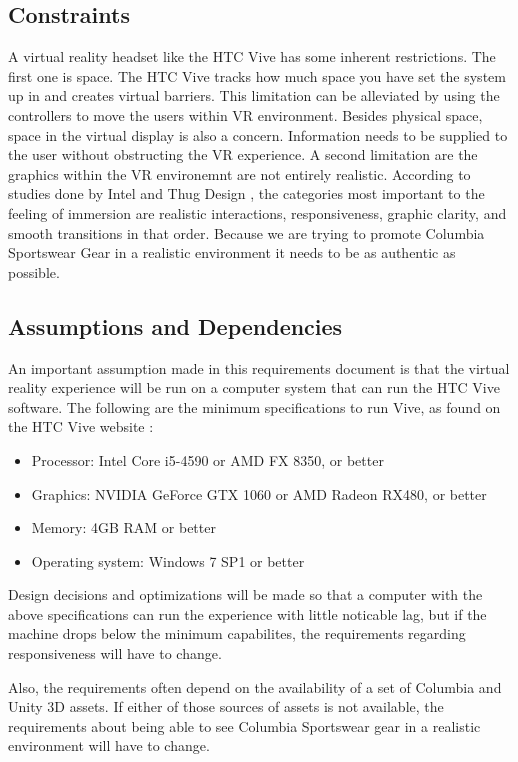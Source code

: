 \documentclass[10pt,journal,compsoc,onecolumn, draftclsnofoot]{IEEEtran}
\begin{document}
\begin{bibunit}
\subsection{Constraints}
A virtual reality headset like the HTC Vive has some inherent restrictions.
The first one is space. The HTC Vive tracks how much space you have set the
system up in and creates virtual barriers. This limitation can be alleviated by
using the controllers to move the users within VR environment. Besides physical
space, space in the virtual display is also a concern. Information needs to be
supplied to the user without obstructing the VR experience. A second
limitation are the graphics within the VR environemnt are not entirely
realistic. According to studies done by Intel and Thug Design \cite{michalak_lind_round1}\cite{michalak_lind_round2}, the categories most
important to the feeling of immersion are realistic interactions, responsiveness,
graphic clarity, and smooth transitions in that order. Because we are trying to
promote Columbia Sportswear Gear in a realistic environment it needs to be as
authentic as possible.

\subsection{Assumptions and Dependencies}
An important assumption made in this requirements document is that the virtual
reality experience will be run on a computer system that can run the HTC Vive
software.  The following are the minimum specifications to run Vive, as found
on the HTC Vive website \cite{htc_vive_ready}:
\begin{itemize}
  \item Processor: Intel Core i5-4590 or AMD FX 8350, or better
  \item Graphics: NVIDIA GeForce GTX 1060 or AMD Radeon RX480, or better
  \item Memory: 4GB RAM or better
  \item Operating system: Windows 7 SP1 or better
\end{itemize}
Design decisions and optimizations will be made so that a computer with the
above specifications can run the experience with little noticable lag, but if
the machine drops below the minimum capabilites, the requirements regarding
responsiveness will have to change.

Also, the requirements often depend on the availability of a set of Columbia
and Unity 3D assets.  If either of those sources of assets is not available,
the requirements about being able to see Columbia Sportswear gear in a
realistic environment will have to change.



\end{bibunit}
\end{document}
